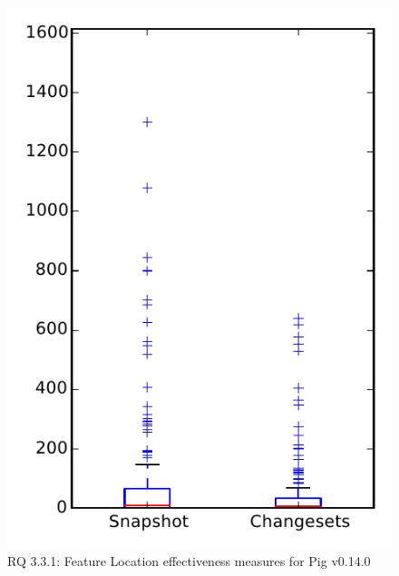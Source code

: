 
\begin{figure}
\centering
\includegraphics[height=0.4\textheight]{figures/flt/rq1_pig}
\caption{RQ 3.3.1: Feature Location effectiveness measures for Pig v0.14.0}
\label{fig:flt:rq1:pig}
\end{figure}
